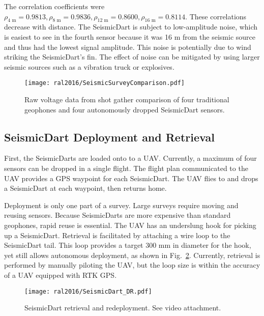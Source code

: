 The correlation coefficients were $\rho_{\text{4 m}}  =  0.9813, \rho_{\text{8 m}}  =  0.9836, \rho_{\text{12 m}}  =  0.8600, \rho_{\text{16 m}}  = 0.8114$.
These correlations decrease with distance.
The SeismicDart is subject to low-amplitude noise, which is easiest to see in the fourth sensor because it was 16 m from the seismic source and thus had the lowest signal amplitude.
This noise is potentially due to wind striking the SeismicDart's fin.
The effect of noise can be mitigated by using larger seismic sources such as a vibration truck or explosives.

\begin{figure} \centering
  {\texttt{[image: ral2016/SeismicSurveyComparison.pdf]}}
 \caption{Raw voltage data from shot gather comparison of four traditional geophones and four autonomously dropped SeismicDart sensors.
 \label{fig:shotgather_auto_drop}}
\end{figure}

\subsection{SeismicDart Deployment and Retrieval}
First, the SeismicDarts are loaded onto to a UAV.
Currently, a maximum of four sensors can be dropped in a single flight.
The flight plan communicated to the UAV provides a GPS waypoint for each SeismicDart.
The UAV flies to and drops a SeismicDart at each waypoint, then returns home.

Deployment is only one part of a survey.
Large surveys require moving and reusing sensors.
Because SeismicDarts are more expensive than standard geophones, rapid reuse is essential.
The UAV has an underslung hook for picking up a SeismicDart.
Retrieval is facilitated by attaching a wire loop to the SeismicDart tail.
This loop provides a target 300 mm in diameter for the hook, yet still allows autonomous deployment, as shown in Fig.~\ref{fig:SeismicDart_DR}.
Currently, retrieval is performed by manually piloting the UAV, but the loop size is within the accuracy of a UAV equipped with RTK GPS.

\begin{figure} \centering
	{\texttt{[image: ral2016/SeismicDart\_DR.pdf]}}
	\caption{
		SeismicDart retrieval and redeployment.
		See video attachment.
	\label{fig:SeismicDart_DR}}
\end{figure}
